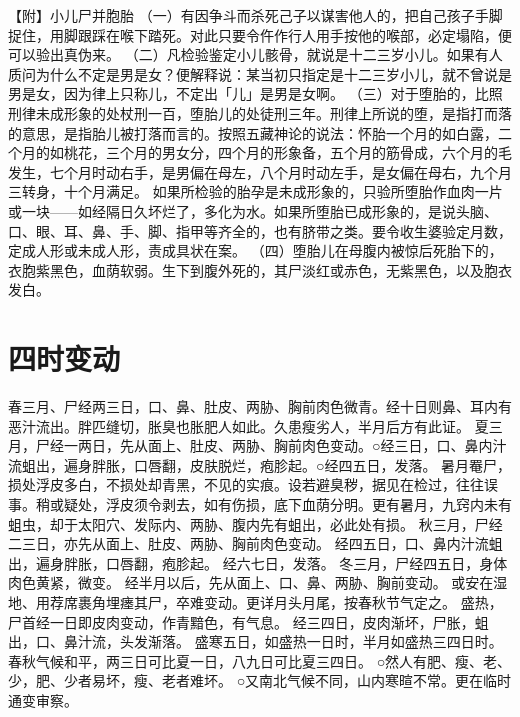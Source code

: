 \documentclass[12pt,UTF8]{ctexbook}
\begin{document}
【附】小儿尸并胞胎
（一）有因争斗而杀死己子以谋害他人的，把自己孩子手脚捉住，用脚跟踩在喉下踏死。对此只要令仵作行人用手按他的喉部，必定塌陷，便可以验出真伪来。
（二）凡检验鉴定小儿骸骨，就说是十二三岁小儿。如果有人质问为什么不定是男是女？便解释说：某当初只指定是十二三岁小儿，就不曾说是男是女，因为律上只称儿，不定出「儿」是男是女啊。
（三）对于堕胎的，比照刑律未成形象的处杖刑一百，堕胎儿的处徒刑三年。刑律上所说的堕，是指打而落的意思，是指胎儿被打落而言的。按照五藏神论的说法：怀胎一个月的如白露，二个月的如桃花，三个月的男女分，四个月的形象备，五个月的筋骨成，六个月的毛发生，七个月时动右手，是男偏在母左，八个月时动左手，是女偏在母右，九个月三转身，十个月满足。
如果所检验的胎孕是未成形象的，只验所堕胎作血肉一片或一块——如经隔日久坏烂了，多化为水。如果所堕胎已成形象的，是说头脑、口、眼、耳、鼻、手、脚、指甲等齐全的，也有脐带之类。要令收生婆验定月数，定成人形或未成人形，责成具状在案。
（四）堕胎儿在母腹内被惊后死胎下的，衣胞紫黑色，血荫软弱。生下到腹外死的，其尸淡红或赤色，无紫黑色，以及胞衣发白。


\chapter{四时变动}

春三月、尸经两三日，口、鼻、肚皮、两胁、胸前肉色微青。经十日则鼻、耳内有恶汁流出。胖匹缝切，胀臭也胀肥人如此。久患瘦劣人，半月后方有此证。
夏三月，尸经一两日，先从面上、肚皮、两胁、胸前肉色变动。○经三日，口、鼻内汁流蛆出，遍身胖胀，口唇翻，皮肤脱烂，疱胗起。○经四五日，发落。
暑月罨尸，损处浮皮多白，不损处却青黑，不见的实痕。设若避臭秽，据见在检过，往往误事。稍或疑处，浮皮须令剥去，如有伤损，底下血荫分明。更有暑月，九窍内未有蛆虫，却于太阳穴、发际内、两胁、腹内先有蛆出，必此处有损。
秋三月，尸经二三日，亦先从面上、肚皮、两胁、胸前肉色变动。
经四五日，口、鼻内汁流蛆出，遍身胖胀，口唇翻，疱胗起。
经六七日，发落。
冬三月，尸经四五日，身体肉色黄紧，微变。
经半月以后，先从面上、口、鼻、两胁、胸前变动。
或安在湿地、用荐席裹角埋瘗其尸，卒难变动。更详月头月尾，按春秋节气定之。
盛热，尸首经一日即皮肉变动，作青黯色，有气息。
经三四日，皮肉渐坏，尸胀，蛆出，口、鼻汁流，头发渐落。
盛寒五日，如盛热一日时，半月如盛热三四日时。
春秋气候和平，两三日可比夏一日，八九日可比夏三四日。
○然人有肥、瘦、老、少，肥、少者易坏，瘦、老者难坏。
○又南北气候不同，山内寒暄不常。更在临时通变审察。
\end{document}

